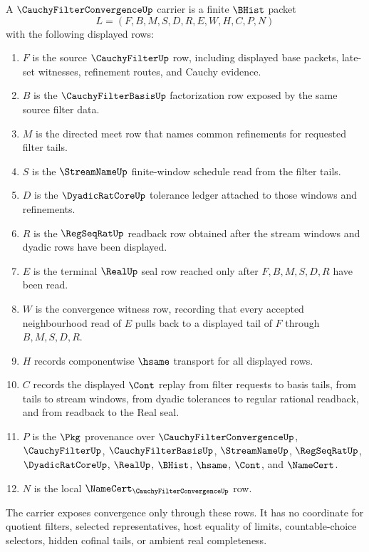 \begin{definition}
\label{def:cauchy-filter-convergence-carrier}
A $\CauchyFilterConvergenceUp$ carrier is a finite $\BHist$ packet
$$
L=(F,B,M,S,D,R,E,W,H,C,P,N)
$$
with the following displayed rows:
\begin{enumerate}
\item $F$ is the source $\CauchyFilterUp$ row, including displayed base packets, late-set witnesses, refinement routes, and Cauchy evidence.
\item $B$ is the $\CauchyFilterBasisUp$ factorization row exposed by the same source filter data.
\item $M$ is the directed meet row that names common refinements for requested filter tails.
\item $S$ is the $\StreamNameUp$ finite-window schedule read from the filter tails.
\item $D$ is the $\DyadicRatCoreUp$ tolerance ledger attached to those windows and refinements.
\item $R$ is the $\RegSeqRatUp$ readback row obtained after the stream windows and dyadic rows have been displayed.
\item $E$ is the terminal $\RealUp$ seal row reached only after $F,B,M,S,D,R$ have been read.
\item $W$ is the convergence witness row, recording that every accepted neighbourhood read of $E$ pulls back to a displayed tail of $F$ through $B,M,S,D,R$.
\item $H$ records componentwise $\hsame$ transport for all displayed rows.
\item $C$ records the displayed $\Cont$ replay from filter requests to basis tails, from tails to stream windows, from dyadic tolerances to regular rational readback, and from readback to the Real seal.
\item $P$ is the $\Pkg$ provenance over $\CauchyFilterConvergenceUp$, $\CauchyFilterUp$, $\CauchyFilterBasisUp$, $\StreamNameUp$, $\RegSeqRatUp$, $\DyadicRatCoreUp$, $\RealUp$, $\BHist$, $\hsame$, $\Cont$, and $\NameCert$.
\item $N$ is the local $\NameCert_{\CauchyFilterConvergenceUp}$ row.
\end{enumerate}
The carrier exposes convergence only through these rows. It has no coordinate for quotient filters, selected representatives, host equality of limits, countable-choice selectors, hidden cofinal tails, or ambient real completeness.
\end{definition}

